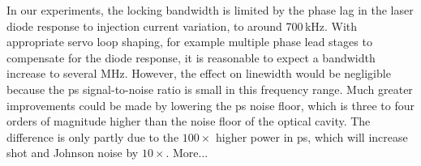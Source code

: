 In our experiments, the locking bandwidth is limited by the phase lag in the laser diode response to injection current variation, to around 700\,kHz.
With appropriate servo loop shaping, for example multiple phase lead stages to compensate for the diode response, it is reasonable to expect a bandwidth increase to several MHz.
However, the effect on linewidth would be negligible because the \gls*{ps} signal-to-noise ratio is small in this frequency range.
Much greater improvements could be made by lowering the \gls*{ps} noise floor, which is three to four orders of magnitude higher than the noise floor of the optical cavity.
The difference is only partly due to the $100\times$ higher power in \gls*{ps}, which will increase shot and Johnson noise by $10\times$.
 More...
